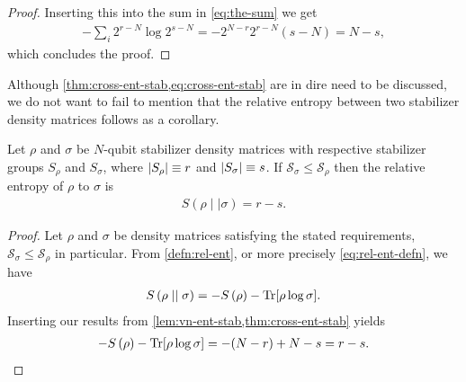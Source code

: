 \begin{proof}
   Inserting this into the sum in \cref{eq:the-sum} we get
   \begin{align}
      -\sum_i 2^{r-N} \log 2^{s-N} =
      -2^{N-r}2^{r-N}\left(s-N\right)= N-s
   ,\end{align}
   which concludes the proof.
\end{proof}

Although \cref{thm:cross-ent-stab,eq:cross-ent-stab} are in dire need to be
discussed, we do not want to fail to mention that the relative entropy between
two stabilizer density matrices follows as a corollary.

\begin{cor}\label{col:rel-ent-stab}
  Let $\rho$ and $\sigma$ be $N$-qubit stabilizer density matrices with
  respective stabilizer groups $S_\rho$ and $S_\sigma$, where $\abs{S_\rho}
  \equiv r$ and $\abs{S_\sigma} \equiv s$. If $\mathcal{S}_\sigma \leq
  \mathcal{S}_\rho$ then the relative entropy of $\rho$ to
  $\sigma$ is
  \begin{align}
    S\left(\rho\mid\mid\sigma\right) = r - s
  .\end{align}
\end{cor}

\begin{proof}
  Let $\rho$ and $\sigma$ be density matrices satisfying the stated
  requirements, $\mathcal{S}_\sigma \leq \mathcal{S}_\rho$ in particular. From \cref{defn:rel-ent},
  or more precisely \cref{eq:rel-ent-defn}, we have
  \begin{align}
    S\left( \rho\mid\mid\sigma \right) = -S\left( \rho \right)
    -\Tr[\rho\log\sigma]
  .\end{align}
  Inserting our results from \cref{lem:vn-ent-stab,thm:cross-ent-stab} yields
  \begin{align}
    -S\left( \rho \right) -\Tr[\rho\log\sigma] = -(N-r) + N - s = r - s
  .\end{align}
\end{proof}

